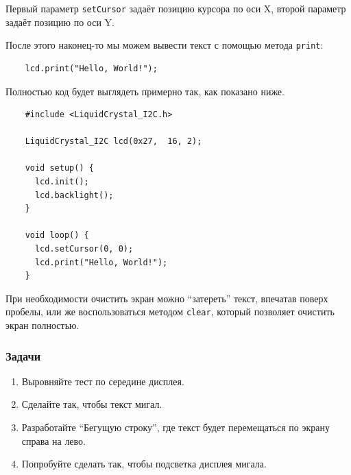 \documentclass[../sparc.tex]{subfiles}
\begin{document}
Первый параметр \texttt{setCursor} задаёт позицию курсора по оси X, второй
параметр задаёт позицию по оси Y.

После этого наконец-то мы можем вывести текст с помощью метода \texttt{print}:

\begin{listing}[ht]
  \begin{verbatim}
    lcd.print("Hello, World!");
  \end{verbatim}
  \caption{Код вывода строки на ЖК-дисплей.}
  \label{listing:game-dev-lcd-print}
\end{listing}

Полностью код будет выглядеть примерно так, как показано ниже.

\begin{listing}[H]
  \begin{verbatim}
    #include <LiquidCrystal_I2C.h>

    LiquidCrystal_I2C lcd(0x27,  16, 2);

    void setup() {
      lcd.init();
      lcd.backlight();
    }

    void loop() {
      lcd.setCursor(0, 0);
      lcd.print("Hello, World!");
    }
  \end{verbatim}
  \caption{Пример простой программы, выводящей текст на ЖК-дисплей.}
  \label{listing:game-dev-lcd-example-00}
\end{listing}

При необходимости очистить экран можно ``затереть'' текст, впечатав поверх
пробелы, или же воспользоваться методом \texttt{clear}, который позволяет
очистить экран полностью.

\subsubsection{Задачи}
\begin{enumerate}
\item Выровняйте тест по середине дисплея.
\item Сделайте так, чтобы текст мигал.
\item Разработайте ``Бегущую строку'', где текст будет перемещаться по экрану
  справа на лево.
\item Попробуйте сделать так, чтобы подсветка дисплея мигала.
\end{enumerate}
\end{document}
